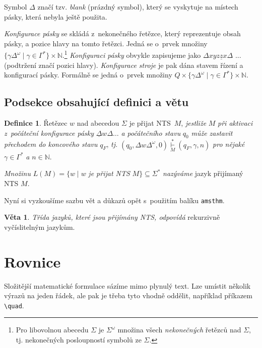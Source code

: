 \documentclass[a4paper, 11pt, twocolumn]{article}
\theoremstyle{definition}
\newtheorem{definition}{Definice}
\newtheorem{lemma}{Věta}
\begin{document}
Symbol $\Delta$ značí tzv. \emph{blank} (prázdný symbol), který se vyskytuje na místech pásky, která nebyla ještě použita.\par
\emph{Konfigurace pásky} se skládá z~nekonečného řetězce, který reprezentuje obsah pásky, a pozice hlavy na tomto řetězci. Jedná se o~prvek množiny $\{\gamma \Delta^{\omega} \mid \gamma \in \Gamma^{*}\} \times \mathbb{N}$.\footnote{Pro libovolnou abecedu $\Sigma$ je $\Sigma^{\omega}$ množina všech \emph{nekonečných} řetězců nad $\Sigma$, tj. nekonečných posloupností symbolů ze $\Sigma$.} 
\emph{Konfiguraci pásky} obvykle zapisujeme jako $\Delta xyz\underline{z}x\Delta$ ... (podtržení značí pozici hlavy).
\emph{Konfigurace stroje} je pak dána stavem řízení a konfigurací pásky. Formálně se jedná o~prvek množiny $Q \times \{\gamma \Delta^{\omega} \mid \gamma \in \Gamma^{*}\} \times \mathbb{N}$.

\subsection{Podsekce obsahující definici a větu}
\begin{definition}
\label{def_2}
Řetězec $w$ nad abecedou $\Sigma$ je přijat NTS~$M$,   \emph{jestliže} $M$ \emph{při aktivaci z~počáteční konfigurace pásky} $\underline{\Delta}w\Delta\ldots$ \emph{a počátečního stavu} $q_0$ \emph{může zastavit přechodem do koncového stavu} $q_F$, \emph{tj.} $(q_0,\Delta w \Delta^{\omega},0)\underset{M}{\overset{*}{\vdash}} (q_F,\gamma,n)$ \emph{pro nějaké} $\gamma \in \Gamma^{*}$ \emph{a} $n \in \mathbb{N}$.\par
\emph{Množinu} $L(M) = \{w \mid w $\emph{ je přijat NTS} $M\} \subseteq\Sigma^{*}$ \emph{nazýváme} jazyk přijímaný NTS $M$.

\end{definition}

Nyní si vyzkoušíme sazbu vět a důkazů opět s~použitím balíku \texttt{amsthm}.

\begin{lemma}
\emph{Třída jazyků, které jsou přijímány NTS, odpovídá} rekurzivně vyčíslitelným jazykům.
\end{lemma}

\section{Rovnice}
Složitější matematické formulace sázíme mimo plynulý text. Lze umístit několik výrazů na jeden řádek, ale pak je třeba tyto vhodně oddělit, například příkazem \verb|\quad|.
\end{document}
